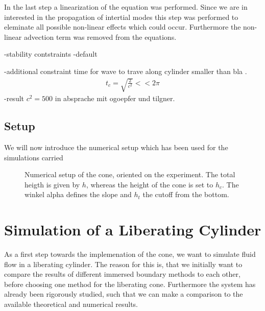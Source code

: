 In the last step a linearization of the equation was performed.
Since we are in interested in the propagation of intertial modes this
step was performed to eleminate all possible non-linear effects which could occur.
Furthermore the non-linear advection term was removed from the equations.

-stability contstraints
-default

-additional constraint time for wave to trave along cylinder smaller than bla \citep{TILGNER, OGOEPFERT}.
\begin{align}
    t_{c} = \sqrt{\frac{2}{c^2}} << 2\pi
\end{align}
-result $c^2 = 500$ in absprache mit ogoepfer und tilgner.



\newpage

\subsection{Setup}

We will now introduce the numerical setup which has been used for the simulations carried



\begin{figure}[!bp]
  \begin{minipage}[c]{0.6\textwidth}
      \centering
  \end{minipage}
  \begin{minipage}[c]{0.3\textwidth}
      \caption{Numerical setup of the cone, oriented on the experiment. The total heigth is given by $h$, whereas the height of the cone is set to $h_c$.
      The winkel alpha defines the slope and $h_t$ the cutoff from the bottom.}
      \label{cone:setxp_image}
  \end{minipage}
\end{figure}

\clearpage

\section{Simulation of a Liberating Cylinder}

As a first step towards the implemenation of the cone,
we want to simulate fluid flow in a liberating cylinder.
The reason for this is, that we initially want to
compare the results of different immersed boundary methods to each other,
before choosing one method for the liberating cone.
Furthermore the system has already been rigorously studied, such that
we can make a comparison to the available theoretical and numerical results.\\

